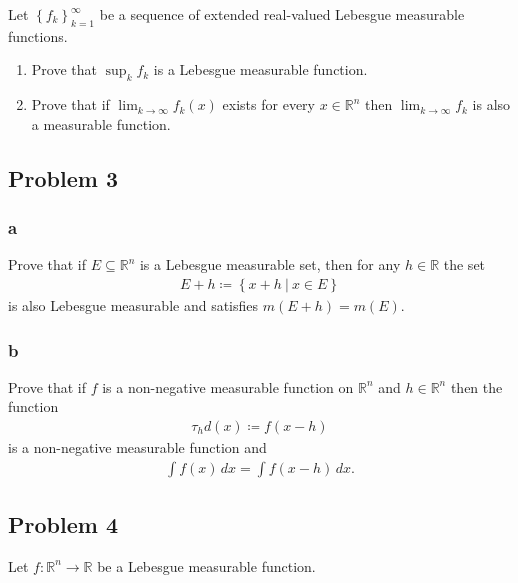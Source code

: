 Let \(\left\{{ f_k }\right\} _{k=1}^{\infty }\) be a sequence of
extended real-valued Lebesgue measurable functions.

\begin{enumerate}
\def\labelenumi{\alph{enumi}.}
\item
  Prove that \(\sup_k f_k\) is a Lebesgue measurable function.
\item
  Prove that if \(\lim_{k \to \infty } f_k(x)\) exists for every
  \(x \in {\mathbb{R}}^n\) then \(\lim_{k\to \infty } f_k\) is also a
  measurable function.
\end{enumerate}

\hypertarget{problem-3}{%
\subsection{Problem 3}\label{problem-3}}

\hypertarget{a}{%
\subsubsection{a}\label{a}}

Prove that if \(E \subseteq {\mathbb{R}}^n\) is a Lebesgue measurable
set, then for any \(h \in {\mathbb{R}}\) the set
\begin{align*}
E+h \coloneqq\left\{{x + h {~\mathrel{\Big|}~}x\in E }\right\}
\end{align*}
is also Lebesgue measurable and satisfies \(m(E + h) = m(E)\).

\hypertarget{b}{%
\subsubsection{b}\label{b}}

Prove that if \(f\) is a non-negative measurable function on
\({\mathbb{R}}^n\) and \(h\in {\mathbb{R}}^n\) then the function
\begin{align*}
\tau_h d(x) \coloneqq f(x-h)
\end{align*}
is a non-negative measurable function and
\begin{align*}
\int f(x) \,dx= \int f(x-h) \,dx
.\end{align*}

\hypertarget{problem-4}{%
\subsection{Problem 4}\label{problem-4}}

Let \(f: {\mathbb{R}}^n\to {\mathbb{R}}\) be a Lebesgue measurable
function.


